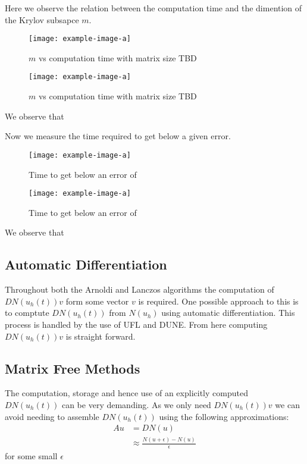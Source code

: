 Here we observe the relation between the computation time and the dimention of the Krylov subsapce $m$.
\begin{figure}[H]
    \centering
    \begin{minipage}{0.49\textwidth}
        \texttt{[image: example-image-a]} %
        \caption{$m$ vs computation time with matrix size TBD}
        \label{fig:mCTKrylov1}
    \end{minipage}\hfill
    \centering
    \begin{minipage}{0.49\textwidth}
        \texttt{[image: example-image-a]} %
        \caption{$m$ vs computation time with matrix size TBD}
        \label{fig:mCTKrylov2}
    \end{minipage}\hfill
\end{figure}
We observe that 

Now we measure the time required to get below a given error.
\begin{figure}[H]
    \centering
    \begin{minipage}{0.49\textwidth}
        \texttt{[image: example-image-a]} %
        \caption{Time to get below an error of}
        \label{fig:ETKrylov1}
    \end{minipage}\hfill
    \centering
    \begin{minipage}{0.49\textwidth}
        \texttt{[image: example-image-a]} %
        \caption{Time to get below an error of}
        \label{fig:ETKrylov2}
    \end{minipage}\hfill
\end{figure}
We observe that 

\subsection{Automatic Differentiation}
Throughout both the Arnoldi and Lanczos algorithms the computation of $DN(u_h(t))v$ form some vector $v$ is required.
One possible approach to this is to comptute $DN(u_h(t))$ from $N(u_h)$ using automatic differentiation.
This process is handled by the use of UFL\cite{Alnaes2014} and DUNE\cite{Bastian2021}.
From here computing $DN(u_h(t))v$ is straight forward.

\subsection{Matrix Free Methods}
The computation, storage and hence use of an explicitly computed $DN(u_h(t))$ can be very demanding.
As we only need $DN(u_h(t))v$ we can avoid needing to assemble $DN(u_h(t))$ using the following approximations:
\begin{align*}
    Au &= DN(u)\\
    &\approx \frac{N(u+\epsilon)-N(u)}{\epsilon}
\end{align*}
for some small $\epsilon$